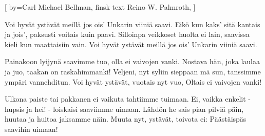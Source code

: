 [
	by={Carl Michael Bellman, finsk text Reino W. Palmroth,
}]
	
\beginverse*						
Voi hyvät ystävät meillä jos ois’
Unkarin viiniä saavi.
Eikö kun kaks’ sitä kantais ja jois’,
paksusti voitais kuin paavi.
Silloinpa veikkoset huolta ei lain,
saavissa kieli kun maattaisiin vain.
Voi hyvät ystävät meillä jos ois’
Unkarin viiniä saavi.
\endverse		

\beginverse*						
Painakoon lyijynä saavimme tuo,
olla ei vaivojen vanki.
Nostava hän, joka laulaa ja juo,
taakan on raskahimmanki!
Veljeni, nyt syliin sieppaan mä sun,
tanssimme ympäri vannehditun.
Voi hyvät ystävät, vuotais nyt vuo,
Oltais ei vaivojen vanki!
\endverse	

\beginverse*						
Ulkona paiste tai pakkanen ei
vaikuta tahtiimme tuimaan.
Ei, vaikka enkelit - hupsis ja hei! - 
loiskaisi saaviimme uimaan.
Lähdön he sais pian pilviä päin,
huutaa ja huitoa jaksamme näin.
Muuta nyt, ystävät, toivota ei:
Päästäispäs saavihin uimaan!
\endverse						
\endsong		
